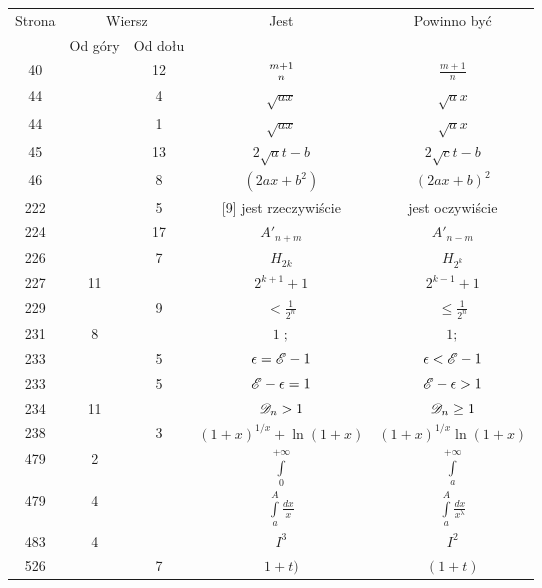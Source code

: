 \documentclass[a4paper,11pt]{article}
\numberwithin{equation}{section}
\renewcommand{\lambda}{\uplambda}
\begin{document}
\begin{center}
  \begin{tabular}{|c|c|c|c|c|}
    \hline
    Strona & \multicolumn{2}{c|}{Wiersz} & Jest
                              & Powinno być \\ \cline{2-3}
    & Od góry & Od dołu & & \\
    \hline
    40  & & 12 & ${ m + 1 \atop n }$ & $\frac{ m + 1 }{ n }$ \\
    44  & & \hphantom{0}4 & $\sqrt{ a x }$ & $\sqrt{ a } x$ \\
    44  & & \hphantom{0}1 & $\sqrt{ a x }$ & $\sqrt{ a } x$ \\
    45  & & 13 & $2 \sqrt{ a } t - b$ & $2 \sqrt{ c } t - b$ \\
    46  & & \hphantom{0}8 & $( 2 a x + b^{ 2 } )$ & $( 2 a x + b )^{ 2 }$ \\
    222 & & \hphantom{0}5 & [9] jest rzeczywiście & jest oczywiście \\
    224 & & 17 & $A'_{ n + m }$ & $A'_{ n - m }$ \\
    226 & & \hphantom{0}7 & $H_{ 2k }$ & $H_{ 2^{ k } }$ \\
    227 & 11 & & $2^{ k + 1 } + 1$ & $2^{ k - 1 } + 1$ \\
    229 & & \hphantom{0}9 & $< \frac{ 1 }{ 2^{ n } }$
    & $\leq \frac{ 1 }{ 2^{ n } }$ \\
    231 & \hphantom{0}8 & & $1\; ;$ & $1;$ \\
    233 & & \hphantom{0}5 & $\epsilon = \mathcal{E} - 1$ & $\epsilon < \mathcal{E} - 1$ \\
    233 & & \hphantom{0}5 & $\mathcal{E} - \epsilon = 1$ & $\mathcal{E} - \epsilon > 1$ \\
    234 & 11 & & $\mathcal{D}_{ n } > 1$ & $\mathcal{D}_{ n } \geq 1$ \\
    238 & & \hphantom{0}3 & $( 1 + x )^{ 1 / x } + \ln( 1 + x )$
           & $( 1 + x )^{ 1 / x } \ln( 1 + x )$ \\
           479 & \hphantom{0}2 & & $\int\limits_{ 0 }^{ +\infty }$
           & $\int\limits_{ a }^{ +\infty }$ \\[0.8em]
           479 & \hphantom{0}4 & & $\int\limits_{ a }^{ A } \frac{ dx }{ x }$
           & $\int\limits_{ a }^{ A } \frac{ dx }{ x^{ \lambda } }$ \\[0.5em]
           483 & \hphantom{0}4 & & $I^{ 3 }$ & $I^{ 2 }$ \\
           526 & & \hphantom{0}7 & $1 + t )$ & $( 1 + t )$ \\
    \hline
  \end{tabular}

\end{center}
\end{document}
